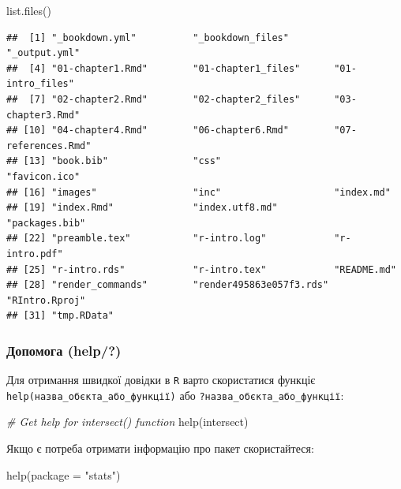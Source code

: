 \documentclass[
]{book}
\newenvironment{Shaded}{\begin{snugshade}}{\end{snugshade}}
\newcommand{\AttributeTok}[1]{\textcolor[rgb]{0.77,0.63,0.00}{#1}}
\newcommand{\CommentTok}[1]{\textcolor[rgb]{0.56,0.35,0.01}{\textit{#1}}}
\newcommand{\FunctionTok}[1]{\textcolor[rgb]{0.00,0.00,0.00}{#1}}
\newcommand{\NormalTok}[1]{#1}
\newcommand{\StringTok}[1]{\textcolor[rgb]{0.31,0.60,0.02}{#1}}
\begin{document}
\begin{Shaded}
\begin{Highlighting}[]
\FunctionTok{list.files}\NormalTok{()}
\end{Highlighting}
\end{Shaded}

\begin{verbatim}
##  [1] "_bookdown.yml"          "_bookdown_files"        "_output.yml"           
##  [4] "01-chapter1.Rmd"        "01-chapter1_files"      "01-intro_files"        
##  [7] "02-chapter2.Rmd"        "02-chapter2_files"      "03-chapter3.Rmd"       
## [10] "04-chapter4.Rmd"        "06-chapter6.Rmd"        "07-references.Rmd"     
## [13] "book.bib"               "css"                    "favicon.ico"           
## [16] "images"                 "inc"                    "index.md"              
## [19] "index.Rmd"              "index.utf8.md"          "packages.bib"          
## [22] "preamble.tex"           "r-intro.log"            "r-intro.pdf"           
## [25] "r-intro.rds"            "r-intro.tex"            "README.md"             
## [28] "render_commands"        "render495863e057f3.rds" "RIntro.Rproj"          
## [31] "tmp.RData"
\end{verbatim}

\hypertarget{chapter1315}{%
\subsubsection{Допомога (help/?)}\label{chapter1315}}

Для отримання швидкої довідки в \texttt{R} варто скористатися функціє \texttt{help(назва\_об\textquotesingle{}єкта\_або\_функції)} або \texttt{?назва\_об\textquotesingle{}єкта\_або\_функції}:

\begin{Shaded}
\begin{Highlighting}[]
\CommentTok{\# Get help for intersect() function}
\FunctionTok{help}\NormalTok{(intersect)}
\end{Highlighting}
\end{Shaded}

Якщо є потреба отримати інформацію про пакет скористайтеся:

\begin{Shaded}
\begin{Highlighting}[]
\FunctionTok{help}\NormalTok{(}\AttributeTok{package =} \StringTok{"stats"}\NormalTok{)}
\end{Highlighting}
\end{Shaded}
\end{document}
